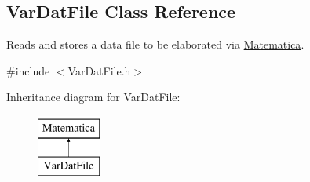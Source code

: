\hypertarget{classVarDatFile}{\subsection{\-Var\-Dat\-File \-Class \-Reference}
\label{classVarDatFile}
}


\-Reads and stores a data file to be elaborated via \hyperlink{classMatematica}{\-Matematica}.  




{\ttfamily \#include $<$\-Var\-Dat\-File.\-h$>$}

\-Inheritance diagram for \-Var\-Dat\-File\-:\begin{figure}[H]
\begin{center}
\leavevmode
\includegraphics[height=2.000000cm]{classVarDatFile}
\end{center}
\end{figure}
